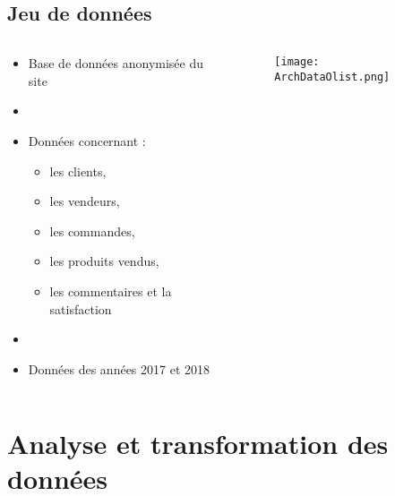 \documentclass[8pt,aspectratio=169,hyperref={unicode=true}]{beamer}
\begin{document}
\subsection{Jeu de données}
\begin{frame}{\insertsubsection}
    \begin{columns}
        \begin{column}{.4\textwidth}
            \begin{itemize}
                \item Base de données anonymisée du site
                \item[]
                \item Données concernant :
                      \begin{itemize}
                          \item les clients,
                          \item les vendeurs,
                          \item les commandes,
                          \item les produits vendus,
                          \item les commentaires et la satisfaction
                      \end{itemize}
                \item[]
                \item Données des années 2017 et 2018
            \end{itemize}
        \end{column}
        \begin{column}{.6\textwidth}
            \begin{figure}
                \texttt{[image: ArchDataOlist.png]}
            \end{figure}
        \end{column}
    \end{columns}
\end{frame}

\section{Analyse et transformation des données}
\end{document}
